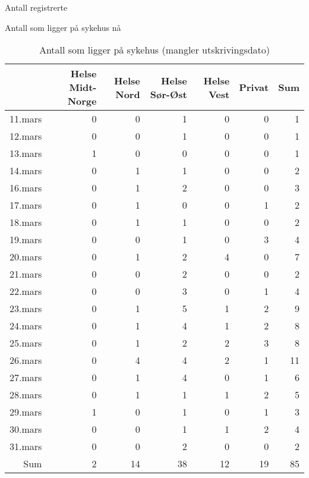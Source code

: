 \documentclass[handout, xcolor=pdftex,dvipsnames,table]{beamer}\usepackage[]{graphicx}\usepackage[]{color}
\begin{document}
\begin{tiny}
\begin{frame}[fragile] {Antall registrerte}

\end{frame}


\begin{frame}[fragile] {Antall som ligger på sykehus nå}

\begin{table}[ht]
\centering
\begin{tabular}{rrrrrrr}
  \hline
 & Helse Midt-Norge & Helse Nord & Helse Sør-Øst & Helse Vest & Privat & Sum \\ 
  \hline
11.mars & 0 & 0 & 1 & 0 & 0 & 1 \\ 
  12.mars & 0 & 0 & 1 & 0 & 0 & 1 \\ 
  13.mars & 1 & 0 & 0 & 0 & 0 & 1 \\ 
  14.mars & 0 & 1 & 1 & 0 & 0 & 2 \\ 
  16.mars & 0 & 1 & 2 & 0 & 0 & 3 \\ 
  17.mars & 0 & 1 & 0 & 0 & 1 & 2 \\ 
  18.mars & 0 & 1 & 1 & 0 & 0 & 2 \\ 
  19.mars & 0 & 0 & 1 & 0 & 3 & 4 \\ 
  20.mars & 0 & 1 & 2 & 4 & 0 & 7 \\ 
  21.mars & 0 & 0 & 2 & 0 & 0 & 2 \\ 
  22.mars & 0 & 0 & 3 & 0 & 1 & 4 \\ 
  23.mars & 0 & 1 & 5 & 1 & 2 & 9 \\ 
  24.mars & 0 & 1 & 4 & 1 & 2 & 8 \\ 
  25.mars & 0 & 1 & 2 & 2 & 3 & 8 \\ 
  26.mars & 0 & 4 & 4 & 2 & 1 & 11 \\ 
  27.mars & 0 & 1 & 4 & 0 & 1 & 6 \\ 
  28.mars & 0 & 1 & 1 & 1 & 2 & 5 \\ 
  29.mars & 1 & 0 & 1 & 0 & 1 & 3 \\ 
  30.mars & 0 & 0 & 1 & 1 & 2 & 4 \\ 
  31.mars & 0 & 0 & 2 & 0 & 0 & 2 \\ 
  Sum & 2 & 14 & 38 & 12 & 19 & 85 \\ 
   \hline
\end{tabular}
\caption{Antall som ligger på sykehus (mangler utskrivingsdato)} 
\end{table}


\end{frame}
\end{tiny}
\end{document}
